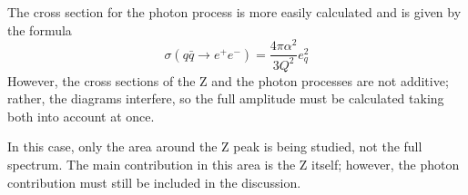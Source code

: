 








The cross section for the photon process 
is more easily calculated and is given by the formula
\[
\sigma(q \bar{q} \rightarrow e^+ e^-) 
= \frac{4 \pi \alpha^2}{3 Q^2} e_q^2
\]
However, the cross sections of the Z and the photon 
processes are not additive; 
rather, the diagrams interfere, 
so the full amplitude must be calculated taking 
both into account at once.  

In this case, only the area around the Z peak is being 
studied, not the full spectrum.  
The main contribution in this area is the Z itself; 
however, the photon contribution must still be included 
in the discussion.  

